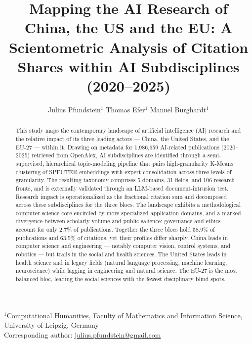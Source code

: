 \documentclass{article}
\title{Mapping the AI Research of China, the US and the EU: A Scientometric Analysis of Citation Shares within AI Subdisciplines (2020--2025)}
\author{Julius Pfundstein$^{1}$ \orcidlink{0009-0002-3717-6125} \quad Thomas Efer$^{1}$ \orcidlink{0000-0002-8376-3884} \quad Manuel Burghardt$^{1}$ \orcidlink{0000-0003-1354-9089}}
\date{}
\begin{document}
	
	\color{darkergray}
	
	\maketitle
	\thispagestyle{empty}
	
	\begin{center}
		{\footnotesize
			$^{1}$Computational Humanities, Faculty of Mathematics and Information Science, University of Leipzig, Germany\\[0.3em]
			Corresponding author: \href{mailto:julius.pfundstein@gmail.com}{julius.pfundstein@gmail.com}
		}
	\end{center}
	
	\vspace{1em}
	
	\begin{abstract}
		\noindent This study maps the contemporary landscape of artificial intelligence (AI) research and the relative impact of its three leading actors --- China, the United States, and the EU-27 --- within it. Drawing on metadata for 1,986,659 AI-related publications (2020--2025) retrieved from OpenAlex, AI subdisciplines are identified through a semi-supervised, hierarchical topic-modeling pipeline that pairs high-granularity K-Means clustering of SPECTER embeddings with expert consolidation across three levels of granularity. The resulting taxonomy comprises 5 domains, 31 fields, and 106 research fronts, and is externally validated through an LLM-based document-intrusion test. Research impact is operationalized as the fractional citation sum and decomposed across these subdisciplines for the three blocs. The landscape exhibits a methodological computer-science core encircled by more specialized application domains, and a marked divergence between scholarly volume and public salience: governance and ethics account for only 2.7\% of publications. Together the three blocs hold 58.9\% of publications and 63.5\% of citations, yet their profiles differ sharply. China leads in computer science and engineering --- notably computer vision, control systems, and robotics --- but trails in the social and health sciences. The United States leads in health science and in legacy fields (natural language processing, machine learning, neuroscience) while lagging in engineering and natural science. The EU-27 is the most balanced bloc, leading the social sciences with the fewest disciplinary blind spots.
	\end{abstract}
	
	\vspace{1em}
	
\end{document}
